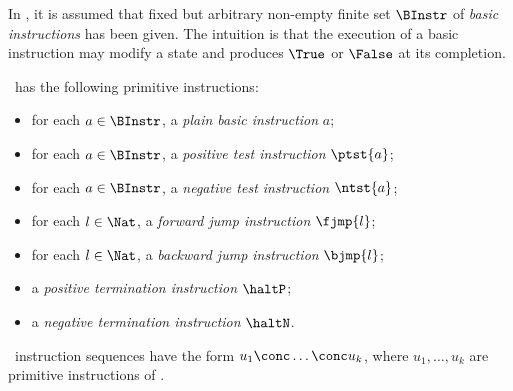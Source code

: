 \documentclass[fleqn]{llncs}
\begin{document}
In \PGLBbt, it is assumed that fixed but arbitrary non-empty finite set
$\BInstr$ of \emph{basic instructions} has been given.
The intuition is that the execution of a basic instruction may modify a
state and produces $\True$ or $\False$ at its completion.

\PGLBbt\ has the following primitive instructions:
\begin{itemize}
\item
for each $a \in \BInstr$, a \emph{plain basic instruction} $a$;
\item
for each $a \in \BInstr$, a \emph{positive test instruction} $\ptst{a}$;
\item
for each $a \in \BInstr$, a \emph{negative test instruction} $\ntst{a}$;
\item
for each $l \in \Nat$, a \emph{forward jump instruction}
$\fjmp{l}$;
\item
for each $l \in \Nat$, a \emph{backward jump instruction}
$\bjmp{l}$;
\item
a \emph{positive termination instruction} $\haltP$;
\item
a \emph{negative termination instruction} $\haltN$.
\end{itemize}
\PGLBbt\ instruction sequences have the form $u_1 \conc \ldots \conc
u_k$, where $u_1,\ldots,u_k$ are primitive instructions of \PGLBbt.
\end{document}
